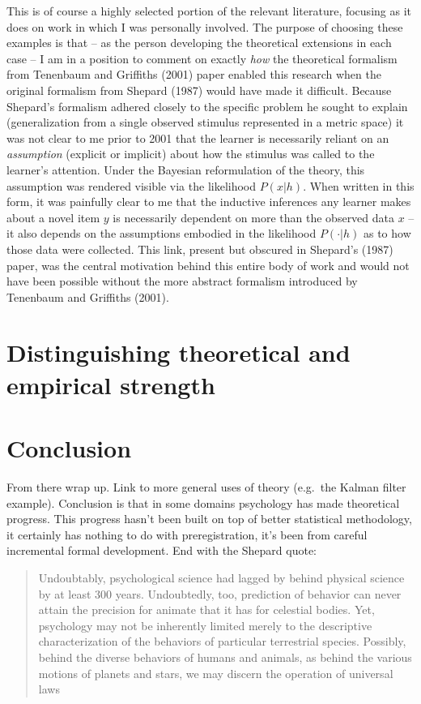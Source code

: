 \documentclass[english,doc]{apa6}
\begin{document}
This is of course a highly selected portion of the relevant literature, focusing as it does on work in which I was personally involved. The purpose of choosing these examples is that -- as the person developing the theoretical extensions in each case -- I am in a position to comment on exactly \emph{how} the theoretical formalism from Tenenbaum and Griffiths (2001) paper enabled this research when the original formalism from Shepard (1987) would have made it difficult. Because Shepard's formalism adhered closely to the specific problem he sought to explain (generalization from a single observed stimulus represented in a metric space) it was not clear to me prior to 2001 that the learner is necessarily reliant on an \emph{assumption} (explicit or implicit) about how the stimulus was called to the learner's attention. Under the Bayesian reformulation of the theory, this assumption was rendered visible via the likelihood \(P(x|h)\). When written in this form, it was painfully clear to me that the inductive inferences any learner makes about a novel item \(y\) is necessarily dependent on more than the observed data \(x\) -- it also depends on the assumptions embodied in the likelihood \(P(\cdot|h)\) as to how those data were collected. This link, present but obscured in Shepard's (1987) paper, was the central motivation behind this entire body of work and would not have been possible without the more abstract formalism introduced by Tenenbaum and Griffiths (2001).

\hypertarget{distinguishing-theoretical-and-empirical-strength}{%
\section{Distinguishing theoretical and empirical strength}\label{distinguishing-theoretical-and-empirical-strength}}

\hypertarget{conclusion}{%
\section{Conclusion}\label{conclusion}}

From there wrap up. Link to more general uses of theory (e.g.~the Kalman filter example). Conclusion is that in some domains psychology has made theoretical progress. This progress hasn't been built on top of better statistical methodology, it certainly has nothing to do with preregistration, it's been from careful incremental formal development. End with the Shepard quote:

\begin{quote}
Undoubtably, psychological science had lagged by behind physical science by at least 300 years. Undoubtedly, too, prediction of behavior can never attain the precision for animate that it has for celestial bodies. Yet, psychology may not be inherently limited merely to the descriptive characterization of the behaviors of particular terrestrial species. Possibly, behind the diverse behaviors of humans and animals, as behind the various motions of planets and stars, we may discern the operation of universal laws
\end{quote}
\end{document}

